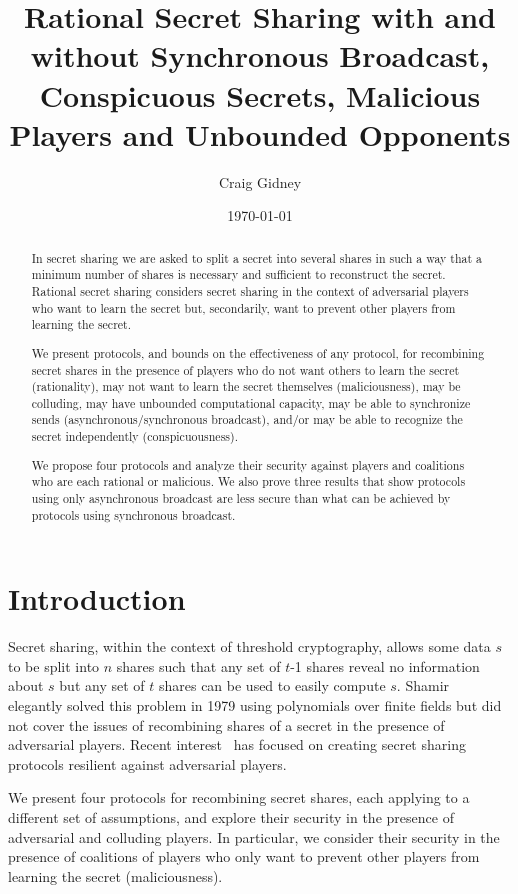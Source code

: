 \documentclass[12pt]{dalcsthesis}
\title{Rational Secret Sharing with and without Synchronous Broadcast, Conspicuous Secrets, Malicious Players and Unbounded Opponents}
\author{Craig Gidney}
\date{\today}
\begin{document}
\mcs
\nolistoftables
\frontmatter

\begin{abstract}
In secret sharing we are asked to split a secret into several shares in such a way that a minimum number of shares is necessary and sufficient to reconstruct the secret. Rational secret sharing considers secret sharing in the context of adversarial players who want to learn the secret but, secondarily, want to prevent other players from learning the secret. 

We present protocols, and bounds on the effectiveness of any protocol, for recombining secret shares in the presence of players who do not want others to learn the secret (rationality), may not want to learn the secret themselves (maliciousness), may be colluding, may have unbounded computational capacity, may be able to synchronize sends (asynchronous/synchronous broadcast), and/or may be able to recognize the secret independently (conspicuousness).

We propose four protocols and analyze their security against players and coalitions who are each rational or malicious. We also prove three results that show protocols using only asynchronous broadcast are less secure than what can be achieved by protocols using synchronous broadcast. 
\end{abstract}

\mainmatter

\chapter{Introduction}

Secret sharing, within the context of threshold cryptography, allows some data $s$ to be split into $n$ shares such that any set of $t$-1 shares reveal no information about $s$ but any set of $t$ shares can be used to easily compute $s$. Shamir~\cite{shamir79} elegantly solved this problem in 1979 using polynomials over finite fields but did not cover the issues of recombining shares of a secret in the presence of adversarial players. Recent interest~\cite{abraham06, fuch10, gordon06, kol08, maleka08, ong09} has focused on creating secret sharing protocols resilient against adversarial players.

We present four protocols for recombining secret shares, each applying to a different set of assumptions, and explore their security in the presence of adversarial and colluding players. In particular, we consider their security in the presence of coalitions of players who only want to prevent other players from learning the secret (maliciousness).
\end{document}
